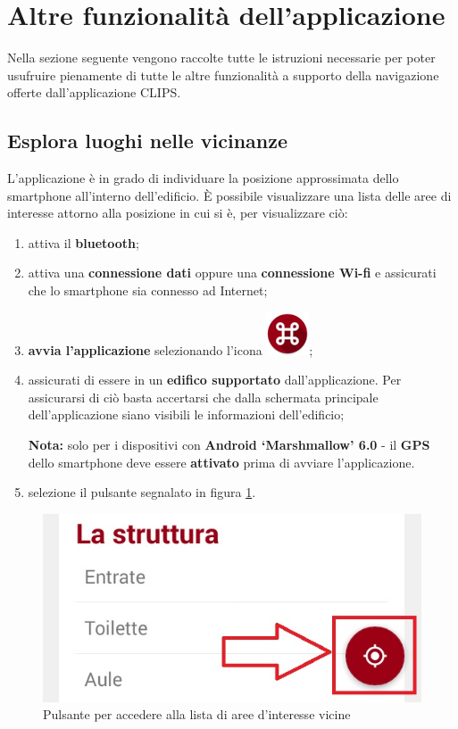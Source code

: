 \documentclass[../ClipsManualeUtente.tex]{subfiles}
\begin{document}
\section{Altre funzionalità dell'applicazione}
	Nella sezione seguente vengono raccolte tutte le istruzioni necessarie per poter usufruire pienamente di tutte le altre funzionalità a supporto della navigazione offerte dall'applicazione CLIPS.
	
	\newpage
	\subsection{Esplora luoghi nelle vicinanze}
		L'applicazione è in grado di individuare la posizione approssimata dello smartphone all'interno dell'edificio.
		È possibile visualizzare una lista delle aree di interesse attorno alla posizione in cui si è, per visualizzare ciò:
		\begin{enumerate}
		\item attiva il \textbf{bluetooth};
		\item attiva una \textbf{connessione dati} oppure una \textbf{connessione Wi-fi} e assicurati che lo smartphone sia connesso ad Internet;
		\item \textbf{avvia l'applicazione} selezionando l'icona \includegraphics[scale=0.4]{img/LogoApp};
		\item assicurati di essere in un \textbf{edifico supportato} dall'applicazione. Per assicurarsi di ciò basta accertarsi che dalla schermata principale dell'applicazione siano visibili le informazioni dell'edificio;
		
		\begin{framed}
			\textbf{Nota:} solo per i dispositivi con \textbf{Android `Marshmallow' 6.0} - il \textbf{GPS} dello smartphone deve essere \textbf{attivato} prima di avviare l'applicazione.
		\end{framed}
		
		\item selezione il pulsante segnalato in figura \ref{fig:PulsanteEsplora}.
		\end{enumerate}
		
		\begin{figure} [h]
			\centering
			\includegraphics[scale=0.3]{img/PulsanteEsplora}
			\caption{Pulsante per accedere alla lista di aree d'interesse vicine}
			\label{fig:PulsanteEsplora}
		\end{figure}
		
\end{document}
